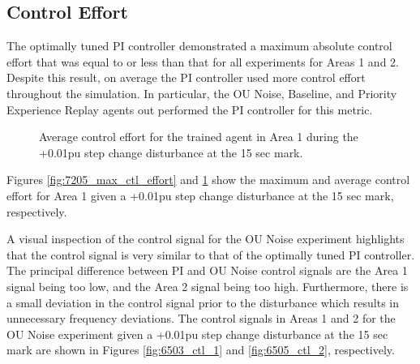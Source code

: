 \subsection{Control Effort}
The optimally tuned PI controller demonstrated a maximum absolute control effort that was equal to or less than that for all experiments for Areas 1 and 2. Despite this result, on average the PI controller used more control effort throughout the simulation. In particular, the OU Noise, Baseline, and Priority Experience Replay agents out performed the PI controller for this metric.

\begin{figure}[h]
	\begin{minipage}[t]{0.50\textwidth}
		\centering
		\resizebox{7cm}{!}{}
		\caption[Maximum absolute control effort comparison]{Maximum control effort for the trained agent in Area 1 during the +0.01pu step change disturbance at the 15 sec mark.}\label{fig:7205_max_ctl_effort}
	\end{minipage}
	\hspace{0.25cm}
	\begin{minipage}[t]{0.50\textwidth}
		\resizebox{7cm}{!}{}
		\caption[Average absolute control effort comparison]{Average control effort for the trained agent in Area 1 during the +0.01pu step change disturbance at the 15 sec mark.}\label{fig:7205_avg_ctl_effort}
	\end{minipage}
\end{figure}

Figures \ref{fig:7205_max_ctl_effort} and \ref{fig:7205_avg_ctl_effort} show the maximum and average control effort for Area 1 given a +0.01pu step change disturbance at the 15 sec mark, respectively.

A visual inspection of the control signal for the OU Noise experiment highlights that the control signal is very similar to that of the optimally tuned PI controller. The principal difference between PI and OU Noise control signals are the Area 1 signal being too low, and the Area 2 signal being too high. Furthermore, there is a small deviation in the control signal prior to the disturbance which results in unnecessary frequency deviations. The control signals in Areas 1 and 2 for the OU Noise experiment given a +0.01pu step change disturbance at the 15 sec mark are shown in Figures \ref{fig:6503_ctl_1} and \ref{fig:6505_ctl_2}, respectively.

